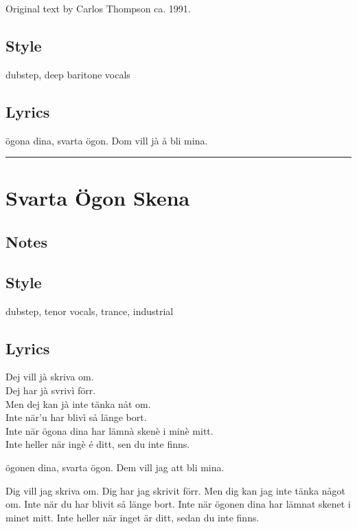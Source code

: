 Original text by Carlos Thompson ca. 1991.

\subsection{Style}\label{style-23}

dubstep, deep baritone vocals

\subsection{Lyrics}\label{lyrics-23}

ögona dina, svarta ögon. Dom vill jà å bli mina.

\begin{center}\rule{0.5\linewidth}{0.5pt}\end{center}

\section{Svarta Ögon Skena}\label{svarta-uxf6gon-skena}

\subsection{Notes}\label{notes-25}

\subsection{Style}\label{style-24}

dubstep, tenor vocals, trance, industrial

\subsection{Lyrics}\label{lyrics-24}

Dej vill jà skriva om.\\
Dej har jà svrivì förr.\\
Men dej kan jà inte tänka nåt om.\\
Inte när'u har blivì så länge bort.\\
Inte när ögona dina har lämnà skenè i minè mitt.\\
Inte heller när ingè é ditt, sen du inte finns.

ögonen dina, svarta ögon. Dem vill jag att bli mina.

Dig vill jag skriva om. Dig har jag skrivit förr. Men dig kan jag inte
tänka något om. Inte när du har blivit så länge bort. Inte när ögonen
dina har lämnat skenet i minet mitt. Inte heller när inget är ditt,
sedan du inte finns.

